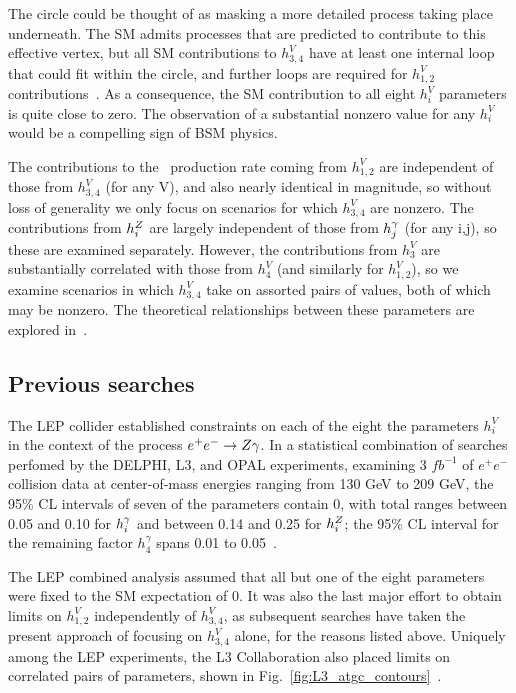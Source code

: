 \documentclass[oneside, letterpaper, 12pt, oldfontcommands]{memoir}
\begin{document}
The circle could be thought of as masking a more detailed process taking place underneath. The SM admits processes that are predicted to contribute
to this effective vertex, but all SM contributions to $h_{3,4}^{V}$ have at least one internal loop that could fit within the circle, and
further loops are required for $h_{1,2}^{V}$ contributions~\cite{ref:PhysRevD.47.4889}.
As a consequence, the SM contribution to all eight $h_{i}^{V}$ parameters is quite close to zero.
The observation of a substantial nonzero value for any $h_{i}^{V}$ would be a compelling sign of BSM physics.

The contributions to the \zinvg\ production rate coming from $h_{1,2}^{V}$ are independent of those from $h_{3,4}^{V}$ (for any V), and also nearly identical
in magnitude, so without loss of generality we only focus on scenarios for which $h_{3,4}^{V}$ are nonzero. The contributions
from $h_{i}^{Z}$ are largely independent of those from $h_{j}^{\gamma}$ (for any i,j), so these are examined separately.
However, the contributions from $h_{3}^{V}$ are substantially correlated with those from $h_{4}^{V}$ (and similarly for $h_{1,2}^{V}$), so we examine
scenarios in which $h_{3,4}^{V}$ take on assorted pairs of values, both of which may be nonzero. The theoretical relationships between these parameters
are explored in~\cite{ref:PhysRevD.47.4889}.

\subsection{Previous searches} \label{sec:introduction_aTGC_previous_searches}
The LEP collider established constraints on each of the eight the parameters $h_{i}^{V}$ in the context of the process $e^{\mathrm{+}}e^{\mathrm{-}} \to Z\gamma$.
In a statistical combination of searches perfomed by the DELPHI, L3, and OPAL experiments, examining 3 $fb^{-1}$ of $e^{\mathrm{+}}e^{\mathrm{-}}$ collision data
at center-of-mass energies ranging from 130 GeV to 209 GeV, the 95\% CL intervals of seven of the parameters contain 0, with total ranges between 0.05 and 0.10 for $h_{i}^{\gamma}$
and between 0.14 and 0.25 for $h_{i}^{Z}$; the 95\% CL interval for the remaining factor $h_{4}^{\gamma}$ spans 0.01 to 0.05~\cite{ref:j.physrep.2013.07.004}.

The LEP combined analysis assumed that all but one of the eight parameters were fixed to the SM expectation of 0.
It was also the last major effort to obtain limits on $h_{1,2}^{V}$ independently of $h_{3,4}^{V}$,
as subsequent searches have taken the present approach of focusing on $h_{3,4}^{V}$ alone, for the reasons listed above.
Uniquely among the LEP experiments, the L3 Collaboration also placed limits on correlated pairs of parameters, shown in Fig.~\ref{fig:L3_atgc_contours}~\cite{ref:j.physletb.2004.07.002}.
\end{document}
